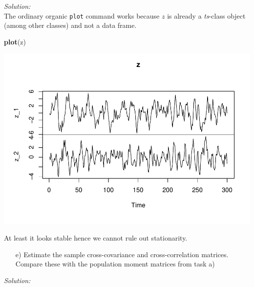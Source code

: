 \documentclass[12pt,a4paper]{article}
\newenvironment{Shaded}{\begin{snugshade}}{\end{snugshade}}
\newcommand{\KeywordTok}[1]{\textcolor[rgb]{0.13,0.29,0.53}{\textbf{#1}}}
\newcommand{\NormalTok}[1]{#1}
\begin{document}
\emph{Solution:}\\

The ordinary organic \texttt{plot} command works because \(z\) is
already a \emph{ts}-class object (among other classes) and not a data
frame.

\begin{Shaded}
\begin{Highlighting}[]
\KeywordTok{plot}\NormalTok{(z)}
\end{Highlighting}
\end{Shaded}

\includegraphics{solution_exercise_2_files/figure-latex/unnamed-chunk-7-1.pdf}

At least it looks stable hence we cannot rule out stationarity.

\begin{itemize}
  \item[e)] Estimate the sample cross-covariance and cross-correlation matrices. Compare these with the population moment matrices from task a)
\end{itemize}

\emph{Solution:}
\end{document}

